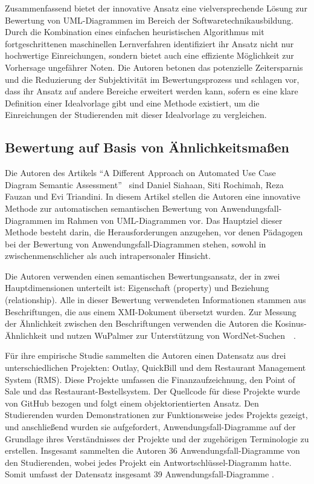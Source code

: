 Zusammenfassend bietet der innovative Ansatz eine vielversprechende Lösung zur Bewertung von UML-Diagrammen im Bereich der Softwaretechnikausbildung. Durch die Kombination eines einfachen heuristischen Algorithmus mit fortgeschrittenen maschinellen Lernverfahren identifiziert ihr Ansatz nicht nur hochwertige Einreichungen, sondern bietet auch eine effiziente Möglichkeit zur Vorhersage ungefährer Noten. Die Autoren betonen das potenzielle Zeitersparnis und die Reduzierung der Subjektivität im Bewertungsprozess und schlagen vor, dass ihr Ansatz auf andere Bereiche erweitert werden kann, sofern es eine klare Definition einer Idealvorlage gibt und eine Methode existiert, um die Einreichungen der Studierenden mit dieser Idealvorlage zu vergleichen.


\subsection{Bewertung auf Basis von Ähnlichkeitsmaßen}

Die Autoren des Artikels ``A Different Approach on Automated Use Case Diagram Semantic Assessment''~\cite{fauzan2021different} sind Daniel Siahaan, Siti Rochimah, Reza Fauzan und Evi Triandini. In diesem Artikel stellen die Autoren eine innovative Methode zur automatischen semantischen Bewertung von Anwendungsfall-Diagrammen im Rahmen von UML-Diagrammen vor. Das Hauptziel dieser Methode besteht darin, die Herausforderungen anzugehen, vor denen Pädagogen bei der Bewertung von Anwendungsfall-Diagrammen stehen, sowohl in zwischenmenschlicher als auch intrapersonaler Hinsicht.

Die Autoren verwenden einen semantischen Bewertungsansatz, der in zwei Hauptdimensionen unterteilt ist: Eigenschaft (property) und Beziehung (relationship). Alle in dieser Bewertung verwendeten Informationen stammen aus Beschriftungen, die aus einem \ac{XMI}-Dokument \cite{xmi} übersetzt wurden. Zur Messung der Ähnlichkeit zwischen den Beschriftungen verwenden die Autoren die Kosinus-Ähnlichkeit und nutzen WuPalmer zur Unterstützung von WordNet-Suchen~\cite{fauzan2021different}~\cite{al2017matching}.

Für ihre empirische Studie sammelten die Autoren einen Datensatz aus drei unterschiedlichen Projekten: Outlay, QuickBill und dem Restaurant Management System (RMS). Diese Projekte umfassen die Finanzaufzeichnung, den Point of Sale und das Restaurant-Bestellsystem. Der Quellcode für diese Projekte wurde von GitHub bezogen und folgt einem objektorientierten Ansatz. Den Studierenden wurden Demonstrationen zur Funktionsweise jedes Projekts gezeigt, und anschließend wurden sie aufgefordert, Anwendungsfall-Diagramme auf der Grundlage ihres Verständnisses der Projekte und der zugehörigen Terminologie zu erstellen. Insgesamt sammelten die Autoren 36 Anwendungsfall-Diagramme von den Studierenden, wobei jedes Projekt ein Antwortschlüssel-Diagramm hatte. Somit umfasst der Datensatz insgesamt 39 Anwendungsfall-Diagramme \cite{fauzan2021different}.

